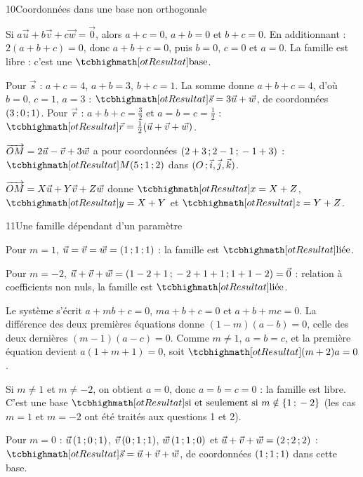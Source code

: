 \corrigesSouples
\begin{corrige}{10}{Coordonnées dans une base non orthogonale}
\begin{questions}
  \item Si $a\vec u+b\vec v+c\vec w=\vec0$, alors $a+c=0$, $a+b=0$ et $b+c=0$. En additionnant : $2(a+b+c)=0$, donc $a+b+c=0$, puis
    $b=0$, $c=0$ et $a=0$. La famille est libre : c'est une $\res{\text{base}}$.
  \item Pour $\vec s$ : $a+c=4$, $a+b=3$, $b+c=1$. La somme donne $a+b+c=4$, d'où $b=0$, $c=1$, $a=3$ : $\res{\vec s=3\vec u+\vec w}$,
    de coordonnées $(3\,{;}\,0\,{;}\,1)$. Pour $\vec r$ : $a+b+c=\frac32$ et $a=b=c=\frac12$ : $\res{\vec r=\tfrac12(\vec u+\vec v+\vec w)}$.
  \item $\overrightarrow{OM}=2\vec u-\vec v+3\vec w$ a pour coordonnées $(2+3\,{;}\,2-1\,{;}\,-1+3)$ : $\res{M(5\pv1\pv2)}$ dans
    $(O\,{;}\,\vec i,\vec j,\vec k)$.
  \item $\overrightarrow{OM}=X\vec u+Y\vec v+Z\vec w$ donne $\res{x=X+Z}$, $\res{y=X+Y}$ et $\res{z=Y+Z}$.
\end{questions}
\end{corrige}

\begin{corrige}{11}{Une famille dépendant d'un paramètre}
\begin{questions}
  \item Pour $m=1$, $\vec u=\vec v=\vec w=(1\,{;}\,1\,{;}\,1)$ : la famille est $\res{\text{liée}}$.
  \item Pour $m=-2$, $\vec u+\vec v+\vec w=(1-2+1\,{;}\,-2+1+1\,{;}\,1+1-2)=\vec0$ : relation à coefficients non nuls, la famille est
    $\res{\text{liée}}$.
  \item Le système s'écrit $a+mb+c=0$, $ma+b+c=0$ et $a+b+mc=0$. La différence des deux premières équations donne
    $(1-m)(a-b)=0$, celle des deux dernières $(m-1)(a-c)=0$. Comme $m\neq1$, $a=b=c$, et la première équation devient
    $a(1+m+1)=0$, soit $\res{(m+2)a=0}$.
  \item Si $m\neq1$ et $m\neq-2$, on obtient $a=0$, donc $a=b=c=0$ : la famille est libre. C'est une base
    $\res{\text{si et seulement si } m\notin\{1\pv-2\}}$ (les cas $m=1$ et $m=-2$ ont été traités aux questions 1 et 2).
  \item Pour $m=0$ : $\vec u\,(1\,{;}\,0\,{;}\,1)$, $\vec v\,(0\,{;}\,1\,{;}\,1)$, $\vec w\,(1\,{;}\,1\,{;}\,0)$ et $\vec u+\vec v+\vec w=(2\,{;}\,2\,{;}\,2)$ :
    $\res{\vec s=\vec u+\vec v+\vec w}$, de coordonnées $(1\,{;}\,1\,{;}\,1)$ dans cette base.
\end{questions}
\end{corrige}

